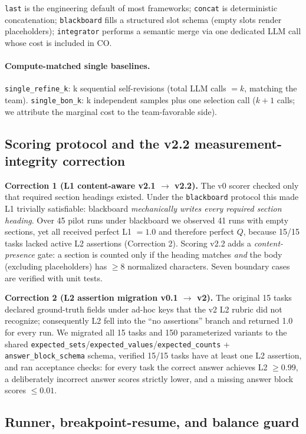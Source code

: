 \documentclass[sigconf,anonymous]{aamas}
\newcommand{\code}[1]{\texttt{#1}}
\begin{document}
\code{last} is the engineering default of most frameworks; \code{concat} is deterministic concatenation; \code{blackboard} fills a structured slot schema (empty slots render placeholders); \code{integrator} performs a semantic merge via one dedicated LLM call whose cost is included in CO.

\paragraph{Compute-matched single baselines.}
\code{single\_refine\_k}: k sequential self-revisions (total LLM calls $= k$, matching the team). \code{single\_bon\_k}: k independent samples plus one selection call ($k{+}1$ calls; we attribute the marginal cost to the team-favorable side).

\subsection{Scoring protocol and the v2.2 measurement-integrity correction}
\label{sec:scoring}

\textbf{Correction 1 (L1 content-aware v2.1 $\to$ v2.2).} The v0 scorer checked only that required section headings existed. Under the \code{blackboard} protocol this made L1 trivially satisfiable: blackboard \emph{mechanically writes every required section heading}. Over 45 pilot runs under blackboard we observed 41 runs with empty sections, yet all received perfect L1 $= 1.0$ and therefore perfect $Q$, because 15/15 tasks lacked active L2 assertions (Correction 2). Scoring v2.2 adds a \emph{content-presence} gate: a section is counted only if the heading matches \emph{and} the body (excluding placeholders) has $\ge$8 normalized characters. Seven boundary cases are verified with unit tests.

\textbf{Correction 2 (L2 assertion migration v0.1 $\to$ v2).} The original 15 tasks declared ground-truth fields under ad-hoc keys that the v2 L2 rubric did not recognize; consequently L2 fell into the ``no assertions'' branch and returned 1.0 for every run. We migrated all 15 tasks and 150 parameterized variants to the shared \code{expected\_sets}/\code{expected\_values}/\code{expected\_counts} + \code{answer\_block\_schema} schema, verified 15/15 tasks have at least one L2 assertion, and ran acceptance checks: for every task the correct answer achieves L2 $\ge 0.99$, a deliberately incorrect answer scores strictly lower, and a missing answer block scores $\le 0.01$.

\subsection{Runner, breakpoint-resume, and balance guard}
\label{sec:runner}
\end{document}
